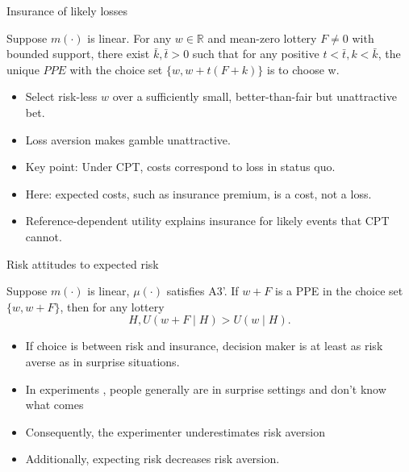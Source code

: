 \begin{frame}{Insurance of likely losses}
    \begin{proposition}
    Suppose $m(\cdot)$ is linear. For any $w \in \mathbb{R}$ and mean-zero lottery $F \neq 0$ with bounded support,     there exist $\bar{k}, \bar{t}>0$ such that for any positive $t<\bar{t}, k<\bar{k}$,
    the unique $P P E$ with the choice set $\{w, w+t(F+k)\}$ is to choose w.\\
    \end{proposition}
    \begin{itemize}
        \item Select risk-less $w$ over a sufficiently small, better-than-fair but unattractive bet.\medskip
        \item Loss aversion makes gamble unattractive.\medskip
        \item Key point:  Under CPT, costs correspond to loss in status quo.\medskip
        \item Here: expected costs, such as insurance premium, is a cost, not a loss.\medskip
        \item Reference-dependent utility explains insurance for likely events that CPT cannot.\medskip
	\end{itemize}
\end{frame}

\begin{frame}{Risk attitudes to expected risk}
    \begin{proposition}
        Suppose $m(\cdot)$ is linear, $\mu(\cdot)$ satisfies A3'.
        If $w+F$ is a PPE in the choice set $\{w, w+F\}$, then for any lottery \[H, U(w+F \mid H)>U(w \mid H).\]
    \end{proposition}
    \begin{itemize}
	\item If choice is between risk and insurance, decision maker is at least as risk averse as in  surprise situations.\medskip
	 \item In experiments , people generally are in surprise settings and don't know what comes\medskip
\item Consequently, the experimenter underestimates risk aversion\medskip
\item    Additionally, expecting risk decreases risk aversion.\medskip
    \end{itemize}
\end{frame}

